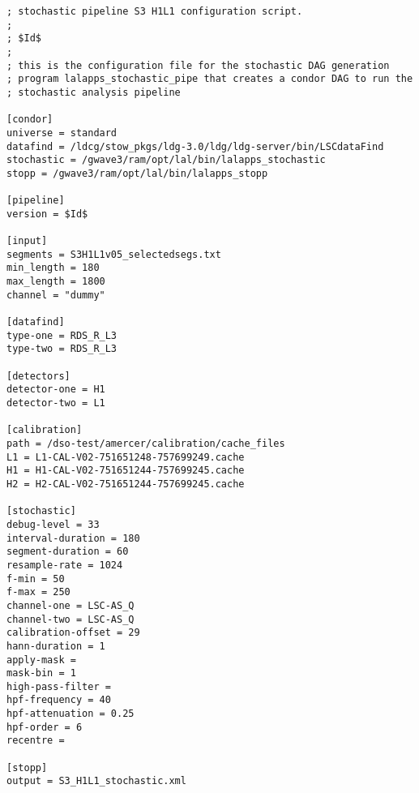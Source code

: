 \begin{verbatim}
; stochastic pipeline S3 H1L1 configuration script.
; 
; $Id$
;
; this is the configuration file for the stochastic DAG generation
; program lalapps_stochastic_pipe that creates a condor DAG to run the
; stochastic analysis pipeline

[condor]
universe = standard
datafind = /ldcg/stow_pkgs/ldg-3.0/ldg/ldg-server/bin/LSCdataFind
stochastic = /gwave3/ram/opt/lal/bin/lalapps_stochastic
stopp = /gwave3/ram/opt/lal/bin/lalapps_stopp

[pipeline]
version = $Id$

[input]
segments = S3H1L1v05_selectedsegs.txt
min_length = 180
max_length = 1800
channel = "dummy"

[datafind]
type-one = RDS_R_L3
type-two = RDS_R_L3

[detectors]
detector-one = H1
detector-two = L1

[calibration]
path = /dso-test/amercer/calibration/cache_files
L1 = L1-CAL-V02-751651248-757699249.cache
H1 = H1-CAL-V02-751651244-757699245.cache
H2 = H2-CAL-V02-751651244-757699245.cache

[stochastic]
debug-level = 33
interval-duration = 180
segment-duration = 60
resample-rate = 1024
f-min = 50
f-max = 250
channel-one = LSC-AS_Q
channel-two = LSC-AS_Q
calibration-offset = 29
hann-duration = 1
apply-mask =
mask-bin = 1
high-pass-filter =
hpf-frequency = 40
hpf-attenuation = 0.25
hpf-order = 6
recentre =

[stopp]
output = S3_H1L1_stochastic.xml
\end{verbatim}
